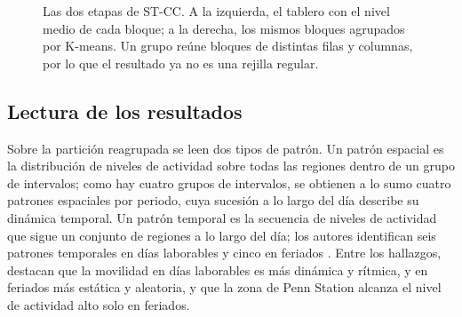 \begin{figure}[ht]
  \centering
  \caption{Las dos etapas de ST-CC. A la izquierda, el tablero con el nivel medio de
  cada bloque; a la derecha, los mismos bloques agrupados por K-means. Un grupo
  reúne bloques de distintas filas y columnas, por lo que el resultado ya no es
  una rejilla regular.}
  \label{fig:stcc-etapas}
\end{figure}

\subsection{Lectura de los resultados}

Sobre la partición reagrupada se leen dos tipos de patrón. Un patrón
espacial es la distribución de niveles de actividad sobre todas las regiones
dentro de un grupo de intervalos; como hay cuatro grupos de intervalos, se
obtienen a lo sumo cuatro patrones espaciales por periodo, cuya sucesión a lo
largo del día describe su dinámica temporal. Un patrón temporal es la
secuencia de niveles de actividad que sigue un conjunto de regiones a lo largo
del día; los autores identifican seis patrones temporales en días laborables y
cinco en feriados \citep[Sec.~IV.D]{Liu2021}. Entre los hallazgos, destacan que la
movilidad en días laborables es más dinámica y rítmica, y en feriados más
estática y aleatoria, y que la zona de Penn Station alcanza el nivel de actividad
alto solo en feriados.

